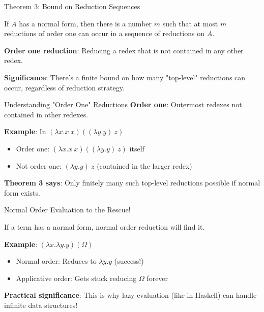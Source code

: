 \documentclass[10pt]{beamer}
\begin{document}
\begin{frame}{Theorem 3: Bound on Reduction Sequences}
\begin{theorem}
If \(A\) has a normal form, then there is a number \(m\) such that at most \(m\) reductions of order one can occur in a sequence of reductions on \(A\).
\end{theorem}

\vspace{0.3cm}
\textbf{Order one reduction}: Reducing a redex that is not contained in any other redex.

\vspace{0.3cm}
\textbf{Significance}: There's a finite bound on how many "top-level" reductions can occur, regardless of reduction strategy.
\end{frame}

\begin{frame}{Understanding "Order One" Reductions}
\textbf{Order one}: Outermost redexes not contained in other redexes.

\vspace{0.3cm}
\textbf{Example}: In \((\lambda x.x\ x)((\lambda y.y)\ z)\)
\begin{itemize}
\item Order one: \((\lambda x.x\ x)((\lambda y.y)\ z)\) itself
\item Not order one: \((\lambda y.y)\ z\) (contained in the larger redex)
\end{itemize}

\vspace{0.3cm}
\textbf{Theorem 3 says}: Only finitely many such top-level reductions possible if normal form exists.
\end{frame}

\begin{frame}{Normal Order Evaluation to the Rescue!}
\begin{theorem}
If a term has a normal form, normal order reduction will find it.
\end{theorem}

\vspace{0.3cm}
\textbf{Example}: \((\lambda x.\lambda y.y)(\Omega)\)
\begin{itemize}
\item Normal order: Reduces to \(\lambda y.y\) (success!)
\item Applicative order: Gets stuck reducing \(\Omega\) forever
\end{itemize}

\vspace{0.3cm}
\textbf{Practical significance}: This is why lazy evaluation (like in Haskell) can handle infinite data structures!
\end{frame}
\end{document}
